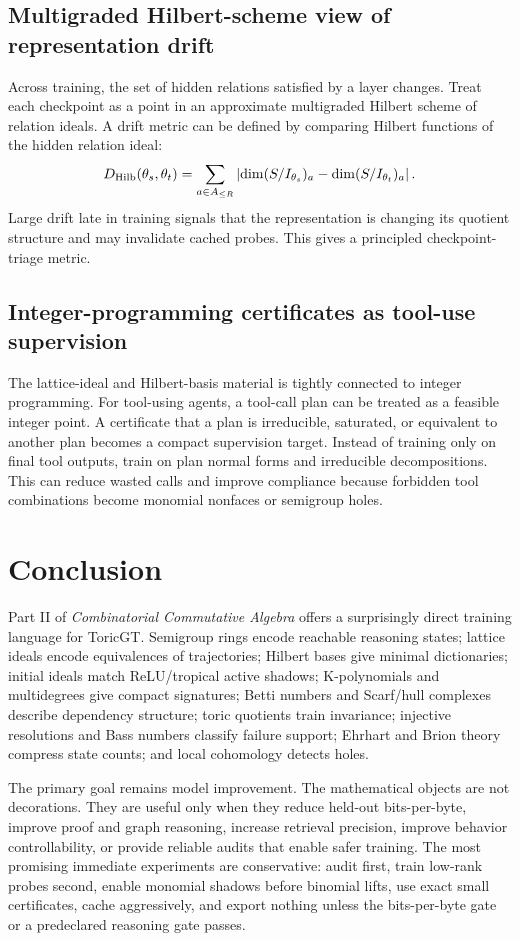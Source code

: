 \documentclass[11pt]{article}
\theoremstyle{definition}
\begin{document}
\subsection{Multigraded Hilbert-scheme view of representation drift}
Across training, the set of hidden relations satisfied by a layer changes.  Treat each checkpoint as a point in an approximate multigraded Hilbert scheme of relation ideals.  A drift metric can be defined by comparing Hilbert functions of the hidden relation ideal:
\[
D_{\rm Hilb}(\theta_s,\theta_t)=\sum_{a\in A_{\le R}}\left|\dim(S/I_{\theta_s})_a-\dim(S/I_{\theta_t})_a\right|.
\]
Large drift late in training signals that the representation is changing its quotient structure and may invalidate cached probes.  This gives a principled checkpoint-triage metric.

\subsection{Integer-programming certificates as tool-use supervision}
The lattice-ideal and Hilbert-basis material is tightly connected to integer programming.  For tool-using agents, a tool-call plan can be treated as a feasible integer point.  A certificate that a plan is irreducible, saturated, or equivalent to another plan becomes a compact supervision target.  Instead of training only on final tool outputs, train on plan normal forms and irreducible decompositions.  This can reduce wasted calls and improve compliance because forbidden tool combinations become monomial nonfaces or semigroup holes.


\section{Conclusion}
Part II of \emph{Combinatorial Commutative Algebra} offers a surprisingly direct training language for ToricGT.  Semigroup rings encode reachable reasoning states; lattice ideals encode equivalences of trajectories; Hilbert bases give minimal dictionaries; initial ideals match ReLU/tropical active shadows; K-polynomials and multidegrees give compact signatures; Betti numbers and Scarf/hull complexes describe dependency structure; toric quotients train invariance; injective resolutions and Bass numbers classify failure support; Ehrhart and Brion theory compress state counts; and local cohomology detects holes.

The primary goal remains model improvement.  The mathematical objects are not decorations.  They are useful only when they reduce held-out bits-per-byte, improve proof and graph reasoning, increase retrieval precision, improve behavior controllability, or provide reliable audits that enable safer training.  The most promising immediate experiments are conservative: audit first, train low-rank probes second, enable monomial shadows before binomial lifts, use exact small certificates, cache aggressively, and export nothing unless the bits-per-byte gate or a predeclared reasoning gate passes.
\end{document}
